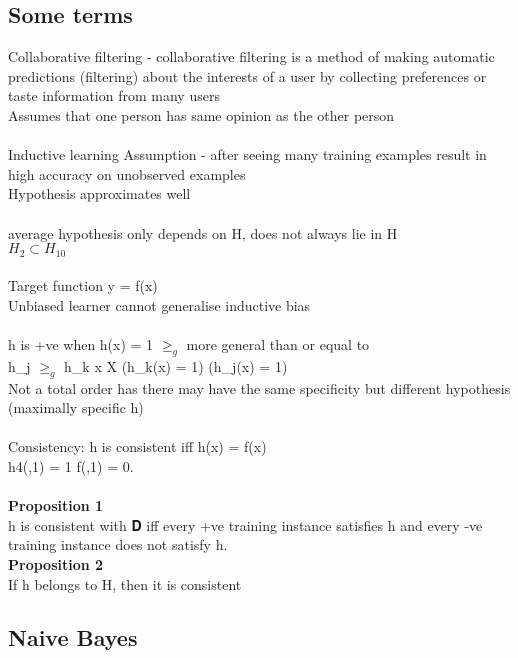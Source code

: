 \documentclass[11pt]{article}
\begin{document}
\noindent
\subsection*{Some terms}
Collaborative filtering - collaborative filtering is a method of making automatic predictions (filtering) about the interests of a user by collecting preferences or taste information from many users\\
Assumes that one person has same opinion as the other person
\\\\
Inductive learning Assumption - after seeing many training examples result in high accuracy on unobserved examples\\
Hypothesis approximates well\\
\\
average hypothesis only depends on H, does not always lie in H\\
$H_{2} \subset H_{10}$\\
\\
Target function y = f(x)\\
Unbiased learner cannot generalise \rightarrow\) inductive bias
\\\\
h is +ve when h(x) = 1
$\geq_{g}$ more general than	 or equal to\\
h_{j} $\geq_{g}$ h_{k} \equiv \forall x \in X (h_{k}(x) = 1) \rightarrow (h_{j}(x) = 1)\)
\\
Not a total order has there may have the same specificity but different hypothesis (maximally specific h)
\\
\\
Consistency: h is consistent iff h(x) = f(x)\\
 h4(,1\rangle) = 1 \neq f(,1\rangle) = 0.\\\\
 \textbf{Proposition 1} \\
\)h is consistent with 𝐃 iff every +ve training instance satisfies h and every
-ve training instance does not satisfy h.\\
 \textbf{Proposition 2} \\
\)If h belongs to H, then it is consistent
\subsection*{Naive Bayes}\\
\end{document}
